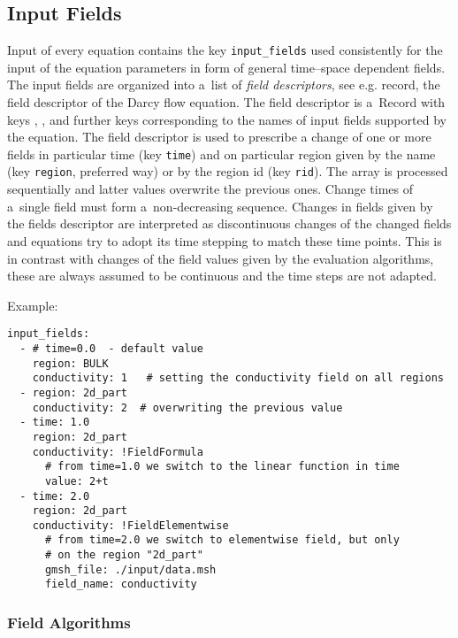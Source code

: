 \subsection{Input Fields}
Input of every equation contains the key \verb'input_fields' used consistently for the input of the equation parameters 
in form of general time--space dependent fields.  The input fields are organized into a~list of {\it field descriptors}, see 
e.g.  record, the field descriptor of the Darcy flow equation.
The field descriptor is a~Record with keys 
, 
, 
and further keys corresponding to the 
names of input fields supported by the equation. The field descriptor is used to prescribe
a change of one or more fields in particular time (key \verb'time') and on particular region given  by the name (key \verb'region', preferred way) 
or by the region id (key \verb'rid'). 
The array is processed sequentially and latter values overwrite the previous ones. Change times of a~single field must form a~non-decreasing sequence.
Changes in fields given by the fields descriptor are interpreted as discontinuous changes of the changed fields
and equations try to adopt its time stepping to match these time points. This is in contrast with changes of the field values given by
the evaluation algorithms, these are always assumed to be continuous and the time steps are not adapted. 



Example:
\begin{verbatim}
input_fields:
  - # time=0.0  - default value
    region: BULK
    conductivity: 1   # setting the conductivity field on all regions
  - region: 2d_part
    conductivity: 2  # overwriting the previous value
  - time: 1.0
    region: 2d_part
    conductivity: !FieldFormula
      # from time=1.0 we switch to the linear function in time
      value: 2+t
  - time: 2.0
    region: 2d_part
    conductivity: !FieldElementwise
      # from time=2.0 we switch to elementwise field, but only
      # on the region "2d_part"
      gmsh_file: ./input/data.msh
      field_name: conductivity
\end{verbatim}



\subsubsection{Field Algorithms}
\label{sec:Fields}\hypertarget{sec:Fields}{}

